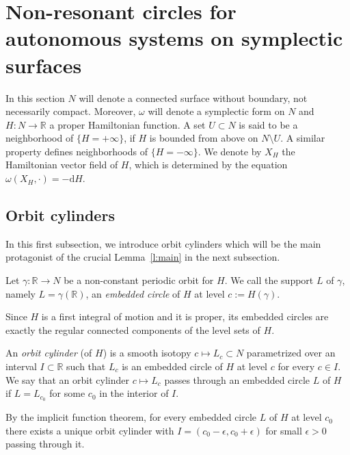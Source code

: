 \documentclass[AHL,Unicode,longabstracts,published]{cedram}
\newcommand{\R}{\mathbb{R}}
\newcommand{\diff}{\mathrm{d}}
\begin{document}
\section{Non-resonant circles for autonomous systems on symplectic surfaces}\label{s:nonresonant}

In this section $N$ will denote a connected surface without boundary, not necessarily compact. Moreover, $\omega$ will denote a symplectic form on $N$ and $H:N\to\R$ a proper Hamiltonian function. A set $U\subset N$ is said to be a neighborhood of $\{H=+\infty\}$, if $H$ is bounded from above on $N\setminus U$. A similar property defines neighborhoods of $\{H=-\infty\}$. We denote by $X_H$ the Hamiltonian vector field of $H$, which is determined by the equation $\omega(X_H,\cdot)=-\diff H$.


\subsection{Orbit cylinders}
In this first subsection, we introduce orbit cylinders which will be the main protagonist of the crucial Lemma~\ref{l:main} in the next subsection.

\begin{defi}
Let $\gamma:\R\to N$ be a non-constant periodic orbit for $H$. We call the support $L$ of $\gamma$, namely $L=\gamma(\R)$, an \emph{embedded circle} of $H$ at level $c:=H(\gamma)$.
\end{defi}

\begin{rema}
Since $H$ is a first integral of motion and it is proper, its embedded circles are exactly the regular connected components of the level sets of $H$.
\end{rema}


\begin{defi}
An \emph{orbit cylinder} (of $H$) is a smooth isotopy $c\mapsto L_c\subset N$ parametrized over an interval $I\subset\R$ such that $L_c$ is an embedded circle of $H$ at level $c$ for every $c\in I$. We say that an orbit cylinder $c\mapsto L_c$ passes through an embedded circle $L$ of $H$ if $L=L_{c_0}$ for some $c_0$ in the interior of $I$.
\end{defi}

\begin{rema}\label{r:imp}
By the implicit function theorem, for every embedded circle $L$ of $H$ at level $c_0$ there exists a unique orbit cylinder with $I=(c_0-\epsilon,c_0+\epsilon)$ for small $\epsilon>0$ passing through it. 
\end{rema}
\end{document}
